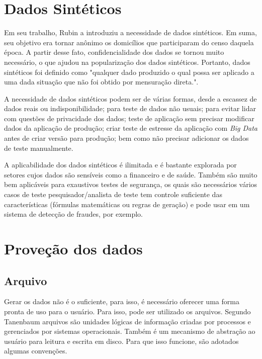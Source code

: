 \documentclass[
	12pt,				%
	openright,			%
	twoside,			%
	a4paper,			%
	english,			%
	brazil				%
	]{abntex2}
\begin{document}
	\section{Dados Sintéticos}
		Em seu trabalho, Rubin \cite{rubin1993statistical} a introduziu a necessidade de dados sintéticos.
		Em suma, seu objetivo era tornar anônimo os domicílios que participaram do censo daquela época.
		A partir desse fato, confidencialidade dos dados se tornou muito necessário, o que ajudou na popularização dos dados sintéticos.
		Portanto, dados sintéticos foi definido como "qualquer dado produzido o qual possa ser aplicado a uma dada situação que não foi obtido por mensuração direta.". \cite{mcgraw-hilleducation2016}
		\par
		A necessidade de dados sintéticos podem ser de várias formas, 
		desde a escassez de dados reais ou indisponibilidade;
		para teste de dados não usuais;
		para evitar lidar com questões de privacidade dos dados;
		teste de aplicação sem precisar modificar dados da aplicação de produção;
		criar teste de estresse da aplicação com \emph{Big Data} antes de criar versão para produção;
		bem como não precisar adicionar os dados de teste manualmente. \cite{top15DatagenTools2019}
		\par
		A aplicabilidade dos dados sintéticos é ilimitada e é bastante explorada por setores cujos dados são sensíveis como a financeiro \cite{lopez2012money} e de saúde. \cite{bergeat2014french} 	
		Também são muito bem aplicáveis para exaustivos testes de segurança, os quais são necessários vários casos de teste
		pesquisador/analista de teste tem controle suficiente das características (fórmulas matemáticas ou regras de geração) e pode usar em um sistema de detecção de fraudes, por exemplo. \cite{barse2003synthesizing}
		
	\section{Proveção dos dados}
		\subsection{Arquivo}
		Gerar os dados não é o suficiente, para isso, é necessário oferecer uma forma pronta de uso para o usuário.
		Para isso, pode ser utilizado os arquivos.
		Segundo Tanenbaum \cite{tanenbaum1995sistemas} arquivos são unidades lógicas de informação criadas por processos e gerenciados por sistemas operacionais.
		Também é um mecanismo de abstração ao usuário para leitura e escrita em disco.
		Para que isso funcione, são adotados algumas convenções.
		\par
\end{document}
